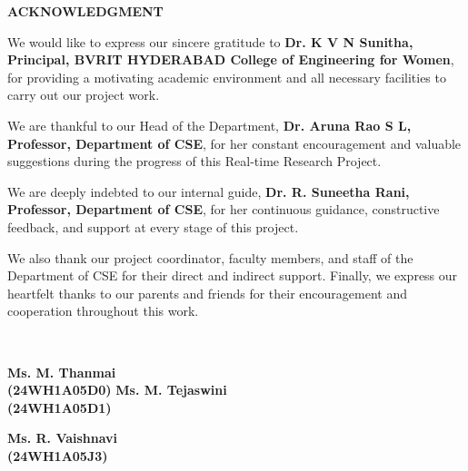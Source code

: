 {\centerline { {\large \textbf{ACKNOWLEDGMENT}}}}
\thispagestyle{empty}
\vspace*{1cm}

We would like to express our sincere gratitude to \textbf{Dr. K V N Sunitha, Principal, BVRIT HYDERABAD College of Engineering for Women}, for providing a motivating academic environment and all necessary facilities to carry out our project work.

We are thankful to our Head of the Department, \textbf{Dr. Aruna Rao S L, Professor, Department of CSE}, for her constant encouragement and valuable suggestions during the progress of this Real-time Research Project.

We are deeply indebted to our internal guide, \textbf{Dr. R. Suneetha Rani, Professor, Department of CSE}, for her continuous guidance, constructive feedback, and support at every stage of this project.

We also thank our project coordinator, faculty members, and staff of the Department of CSE for their direct and indirect support. Finally, we express our heartfelt thanks to our parents and friends for their encouragement and cooperation throughout this work.

\begin{minipage}{10cm}
~\\
\end{minipage}
\begin{minipage}{20cm}
\vskip 1cm
  \textbf{Ms. M. Thanmai}\\
  \textbf{(24WH1A05D0)}
\vskip 2cm
    \textbf{Ms. M. Tejaswini}\\
  \textbf{(24WH1A05D1)}

  \vskip 2cm
    \textbf{Ms. R. Vaishnavi}\\
  \textbf{(24WH1A05J3)}
\end{minipage}

